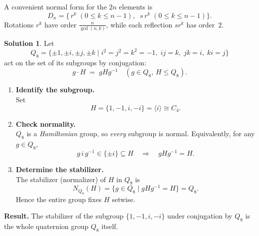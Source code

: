 \documentclass[12pt]{article}
\theoremstyle{definition} %
\newtheorem{solution}{Solution}
\theoremstyle{plain} %
\begin{document}
A convenient normal form for the $2n$ elements is
\[
  D_{n}
  =\bigl\{\,r^{k}\;(0\le k\le n-1),\;\;
           s\,r^{k}\;(0\le k\le n-1)\bigr\}.
\]
Rotations $r^{k}$ have order $\tfrac{n}{\gcd(n,k)}$,
while each reflection $sr^{k}$ has order $2$.
\begin{solution}
  Let 
  \[
    Q_{8}= \{\pm 1,\pm i,\pm j,\pm k \mid i^{2}=j^{2}=k^{2}=-1,\; ij=k,\; jk=i,\; ki=j\}
  \]
  act on the set of its subgroups by conjugation:
  \[
    g\cdot H \;=\; gHg^{-1}\quad (g\in Q_{8},\, H\le Q_{8}).
  \]

  \begin{enumerate}
    \item \textbf{Identify the subgroup.}\\
          Set 
          \[
            H=\{1,-1,i,-i\}= \langle i\rangle \cong C_{4}.
          \]

    \item \textbf{Check normality.}\\
          $Q_{8}$ is a \emph{Hamiltonian} group, so \emph{every} subgroup is normal.  
          Equivalently, for any $g\in Q_{8}$,
          \[
            g\,i\,g^{-1}\in\{\pm i\}\subseteq H
            \quad\Longrightarrow\quad
            gHg^{-1}=H.
          \]

    \item \textbf{Determine the stabilizer.}\\
          The stabilizer (normalizer) of $H$ in $Q_{8}$ is
          \[
            N_{Q_{8}}(H)=\{g\in Q_{8}\mid gHg^{-1}=H\}=Q_{8}.
          \]
          Hence the entire group fixes $H$ setwise.
  \end{enumerate}

  \vspace{0.5em}
  \textbf{Result.}\;
  The stabilizer of the subgroup $\{1,-1,i,-i\}$ under conjugation by $Q_{8}$ is the whole quaternion group $Q_{8}$ itself.
\end{solution}
\end{document}
